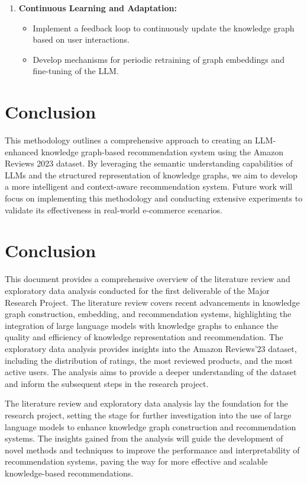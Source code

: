 \documentclass{article}
\begin{document}
\begin{enumerate}
    \item \textbf{Continuous Learning and Adaptation:}
    \begin{itemize}
        \item Implement a feedback loop to continuously update the knowledge graph based on user interactions.
        \item Develop mechanisms for periodic retraining of graph embeddings and fine-tuning of the LLM.
    \end{itemize}
\end{enumerate}

\section{Conclusion}
This methodology outlines a comprehensive approach to creating an LLM-enhanced knowledge graph-based recommendation system using the Amazon Reviews 2023 dataset. By leveraging the semantic understanding capabilities of LLMs and the structured representation of knowledge graphs, we aim to develop a more intelligent and context-aware recommendation system. Future work will focus on implementing this methodology and conducting extensive experiments to validate its effectiveness in real-world e-commerce scenarios.


\section{Conclusion}

This document provides a comprehensive overview of the literature review and exploratory data analysis conducted for the first deliverable of the Major Research Project. The literature review covers recent advancements in knowledge graph construction, embedding, and recommendation systems, highlighting the integration of large language models with knowledge graphs to enhance the quality and efficiency of knowledge representation and recommendation. The exploratory data analysis provides insights into the Amazon Reviews'23 dataset, including the distribution of ratings, the most reviewed products, and the most active users. The analysis aims to provide a deeper understanding of the dataset and inform the subsequent steps in the research project.

The literature review and exploratory data analysis lay the foundation for the research project, setting the stage for further investigation into the use of large language models to enhance knowledge graph construction and recommendation systems. The insights gained from the analysis will guide the development of novel methods and techniques to improve the performance and interpretability of recommendation systems, paving the way for more effective and scalable knowledge-based recommendations.
\end{document}
